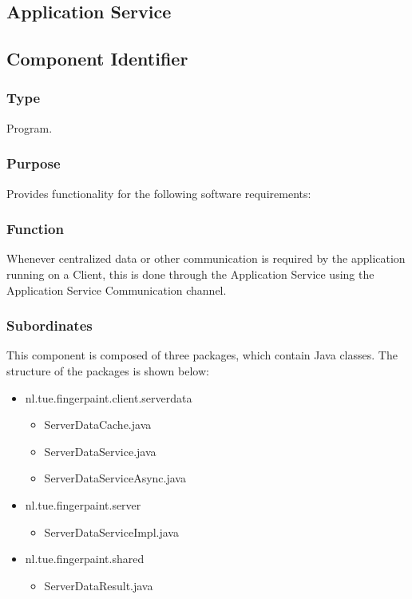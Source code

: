 \subsection{Application Service}
\label{subsec:appservice}

\subsection*{Component Identifier}
\RTMSAS{}

\subsubsection*{Type}
Program.

\subsubsection*{Purpose}
Provides functionality for the following software requirements:

\noindent {}

\subsubsection*{Function}
Whenever centralized data or other communication is required by the application running on a Client, this is done through the Application Service using the Application Service Communication channel.

\subsubsection*{Subordinates}
This component is composed of three packages, which contain Java classes. The structure of the packages is shown below:
\begin{itemize}
	\item nl.tue.fingerpaint.client.serverdata
		\begin{itemize}
			\item ServerDataCache.java
			\item ServerDataService.java
			\item ServerDataServiceAsync.java
		\end{itemize}
	
	\item nl.tue.fingerpaint.server
		\begin{itemize}
			\item ServerDataServiceImpl.java
		\end{itemize}
	
	\item nl.tue.fingerpaint.shared
		\begin{itemize}
			\item ServerDataResult.java
		\end{itemize}
\end{itemize}

